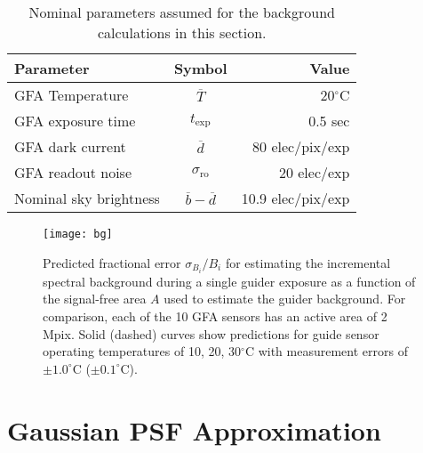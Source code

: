 \documentclass[11pt]{article}
\begin{document}
\begin{table}[htb]
\begin{center}
\begin{tabular}{lcr}
Parameter & Symbol & Value \\
\hline
GFA Temperature & $\overline{T}$ & 20$^\circ$C \\
GFA exposure time & $t_{\text{exp}}$ & 0.5 sec \\
GFA dark current & $\overline{d}$ & 80 elec/pix/exp \\
GFA readout noise & $\sigma_{\text{ro}}$ & 20 elec/exp \\
Nominal sky brightness & $\overline{b} - \overline{d}$ & 10.9 elec/pix/exp \\
\hline
\end{tabular}
\end{center}
\caption{Nominal parameters assumed for the background calculations in this section.}
\label{tab:bgpar}
\end{table}

\begin{figure}[htb]
\begin{center}
\texttt{[image: bg]}
\caption{Predicted fractional error $\sigma_{B_i}/B_i$ for estimating the incremental spectral background during a single guider exposure as a function of the signal-free area $A$ used to estimate the guider background. For comparison, each of the 10 GFA sensors has an active area of 2 Mpix. Solid (dashed) curves show predictions for guide sensor operating temperatures of 10, 20, 30$^\circ$C with measurement errors of $\pm1.0^\circ$C ($\pm 0.1^\circ$C).}
\label{fig:bgpar}
\end{center}
\end{figure}

\section{Gaussian PSF Approximation}
\end{document}

